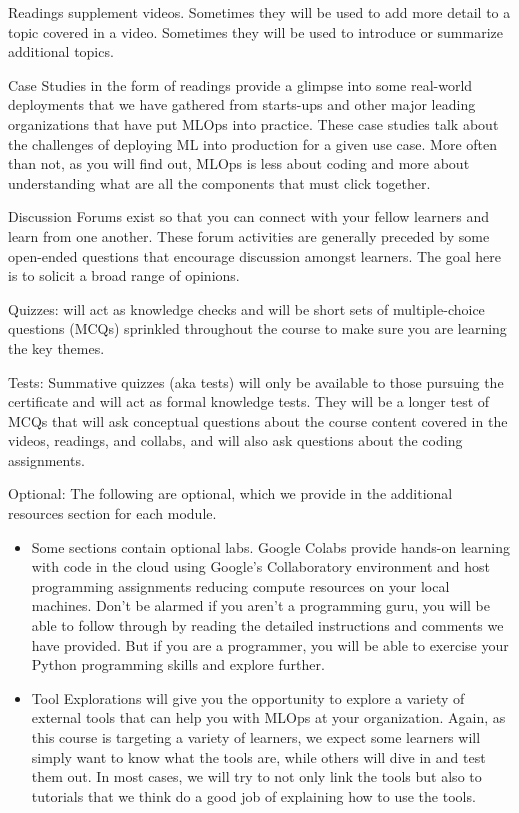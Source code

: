Readings supplement videos. Sometimes they will be used to add more detail to a topic covered in a video. Sometimes they will be used to introduce or summarize additional topics.

Case Studies in the form of readings provide a glimpse into some real-world deployments that we have gathered from starts-ups and other major leading organizations that have put MLOps into practice. These case studies talk about the challenges of deploying ML into production for a given use case. More often than not, as you will find out, MLOps is less about coding and more about understanding what are all the components that must click together. 

Discussion Forums exist so that you can connect with your fellow learners and learn from one another. These forum activities are generally preceded by some open-ended questions that encourage discussion amongst learners. The goal here is to solicit a broad range of opinions. 

Quizzes: will act as knowledge checks and will be short sets of multiple-choice questions (MCQs) sprinkled throughout the course to make sure you are learning the key themes. 

Tests: Summative quizzes (aka tests) will only be available to those pursuing the certificate and will act as formal knowledge tests. They will be a longer test of MCQs that will ask conceptual questions about the course content covered in the videos, readings, and collabs, and will also ask questions about the coding assignments.

Optional: The following are optional, which we provide in the additional resources section for each module.

\begin{itemize}
    \item Some sections contain optional labs. Google Colabs provide hands-on learning with code in the cloud using Google’s Collaboratory environment and host programming assignments reducing compute resources on your local machines. Don’t be alarmed if you aren’t a programming guru, you will be able to follow through by reading the detailed instructions and comments we have provided. But if you are a programmer, you will be able to exercise your Python programming skills and explore further. 
    \item Tool Explorations will give you the opportunity to explore a variety of external tools that can help you with MLOps at your organization. Again, as this course is targeting a variety of learners, we expect some learners will simply want to know what the tools are, while others will dive in and test them out. In most cases, we will try to not only link the tools but also to tutorials that we think do a good job of explaining how to use the tools.
\end{itemize}

